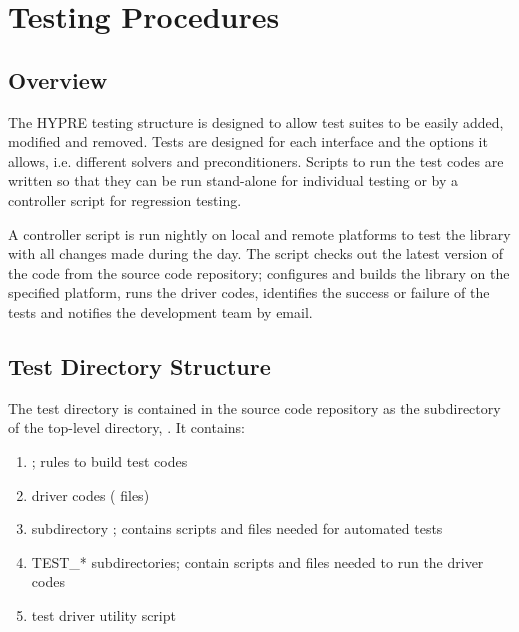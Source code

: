 \chapter{Testing Procedures}
\label{Testing Procedures}

\section{Overview}
\label{Overview}

The HYPRE testing structure is designed to allow test suites to be easily added,
modified and removed.  Tests are designed for each interface and the options it
allows, i.e. different solvers and preconditioners.  Scripts to run the test codes 
are written so that they can be run stand-alone for individual testing or by a 
controller script for regression testing.

A controller script is run nightly on local and remote platforms to test the 
library with all changes made during the day.  The script checks out the latest 
version of the code from the source code repository; configures and builds the
library on the specified platform, runs the driver codes, identifies the success
or failure of the tests and notifies the development team by email. 

\section{Test Directory Structure}
\label{Test Directory Structure}

The test directory is contained in the source code repository as the  
subdirectory of the top-level directory, .  It contains:
\begin{enumerate}
\item {}; rules to build test codes
\item driver codes ( files)
\item subdirectory ; contains scripts and files needed for automated tests 
\item TEST\_* subdirectories; contain scripts and files needed to run the driver codes 
\item {} test driver utility script
\end{enumerate}

